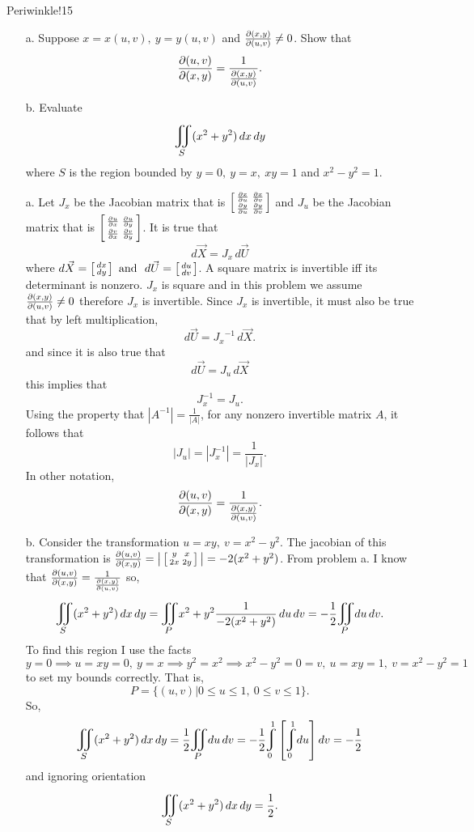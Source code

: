 \documentclass[titlepage]{article}
\begin{document}
\begin{cproblem}{3}{Periwinkle!15}
\phantom{-} \\
\vspace{-.5cm}
\begin{itemize}
\item[a.]Suppose $x = x(u,v), \ y = y(u,v)$ and $\frac{\partial(x,y)}{\partial(u,v)} \neq 0$. Show that
$$\frac{\partial(u,v)}{\partial(x,y)} = \frac{1}{\frac{\partial(x,y)}{\partial(u,v)}}.$$
\item[b.] Evaluate
$$\bigiint{S} \,(x^2 + y^2)\,dx\,dy$$
where $S$ is the region bounded by $y = 0,\ y = x, \ xy = 1 $ and $x^2 - y^2 = 1$. 
\end{itemize}
\end{cproblem}
\begin{solution}
\vspace{-.5cm}
\begin{itemize}
\item[a.] Let $J_x$ be the Jacobian matrix that is $\left[\begin{smallmatrix}\frac{\partial x}{\partial u} & \frac{\partial x}{\partial v} \\ \frac{\partial y}{\partial u} & \frac{\partial y}{\partial v}\end{smallmatrix}\right]$ and $J_u$ be the Jacobian matrix that is $\left[\begin{smallmatrix}\frac{\partial u}{\partial x} & \frac{\partial u}{\partial y} \\ \frac{\partial v}{\partial x} & \frac{\partial v}{\partial y}\end{smallmatrix}\right]$. It is true that 
$$d\vec{X} = J_x \,d\vec{U}$$
where $d\vec{X} = \left[\begin{smallmatrix}dx \\ dy\end{smallmatrix}\right] \text{ and } \ d\vec{U} = \left[\begin{smallmatrix}du \\ dv\end{smallmatrix}\right]$.
A square matrix is invertible iff its determinant is nonzero. $J_x$ is square and in this problem we assume $\frac{\partial(x,y)}{\partial(u,v)} \neq 0$ therefore $J_x$ is invertible. Since $J_x$ is invertible, it must also be true that by left multiplication,
$$d\vec{U} = {J_x}^{-1}\,d\vec{X}.$$
and since it is also true that 
$$d\vec{U} = {J_u}\,d\vec{X}$$
this implies that 
$$J_x^{-1} = J_u.$$
Using the property that $|A^{-1}| = \frac{1}{|A|}$, for any nonzero invertible matrix $A$, it follows that 
$$|J_u| = |J_x^{-1}| = \frac{1}{|J_x|}.$$
In other notation,
$$\frac{\partial(u,v)}{\partial(x,y)} = \frac{1}{\frac{\partial(x,y)}{\partial(u,v)}}. $$

\item[b.] Consider the transformation $u = xy, \ v = x^2 - y^2$. The jacobian of this transformation is $\frac{\partial(u,v)}{\partial(x,y)} = \big|\left[\begin{smallmatrix}y & x \\ 2x & 2y\end{smallmatrix}\right]\big| = -2(x^2 + y^2)$. From problem a. I know that $\frac{\partial(u,v)}{\partial(x,y)} = \frac{1}{\frac{\partial(x,y)}{\partial(u,v)}}$ so, 
$$\bigiint{S} \,(x^2 + y^2)\,dx\,dy = \bigiint{P}\, x^2 + y^2 \frac{1}{-2(x^2 + y^2)}\,du\,dv = -\frac{1}{2}\bigiint{P}\,du\,dv.$$
To find this region I use the facts
$$y = 0 \implies u = xy = 0, \  y = x \implies y^2 = x^2 \implies x^2 - y^2 = 0 = v, \ u = xy = 1, \ v = x^2 - y^2 = 1$$
to set my bounds correctly. That is,
$$ P = \{(u,v)| 0\leq u \leq 1, \ 0\leq v \leq 1\}.$$
So,
$$\bigiint{S} \,(x^2 + y^2)\,dx\,dy = \frac{1}{2}\bigiint{P}\,du\,dv = -\frac{1}{2}\mlvarint\limits_{0}^{1}\left[\mlvarint\limits_{0}^{1}du\right]dv = -\frac{1}{2}$$
and ignoring orientation
$$\bigiint{S} \,(x^2 + y^2)\,dx\,dy = \frac{1}{2}.$$
\end{itemize}
\end{solution}
\end{document}
